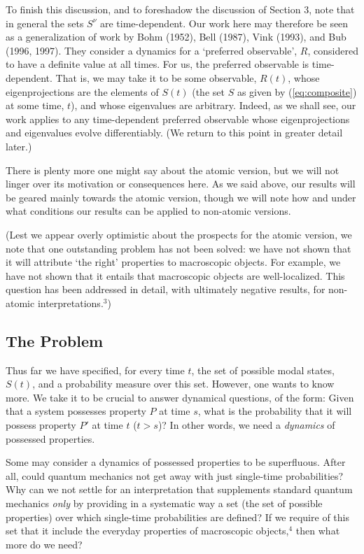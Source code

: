 \documentclass[12pt]{article}
\newcommand{\gn}{\nu}                                           %
\begin{document}
To finish this discussion, and to foreshadow the discussion of Section 
3, note that in general the sets $S^{\gn}$ are time-dependent.  Our 
work here may therefore be seen as a generalization of work by Bohm 
(1952), Bell (1987), Vink (1993), and Bub (1996, 1997).  They consider 
a dynamics for a `preferred observable', $R$, considered to have a 
definite value at all times.  For us, the preferred observable is 
time-dependent.  That is, we may take it to be some observable, 
$R(t)$, whose eigenprojections are the elements of $S(t)$ (the set $S$ 
as given by (\ref{eq:composite}) at some time, $t$), and whose 
eigenvalues are arbitrary.  Indeed, as we shall see, our work applies 
to any time-dependent preferred observable whose eigenprojections and 
eigenvalues evolve differentiably.  (We return to this point in 
greater detail later.)

There is plenty more one might say about the atomic version, but we
will not linger over its motivation or consequences here.  As we said
above, our results will be geared mainly towards the atomic version,
though we will note how and under what conditions our results can be
applied to non-atomic versions.

(Lest we appear overly optimistic about the prospects for the atomic
version, we note that one outstanding problem has not been solved: we have
not shown that it will attribute `the right' properties to macroscopic
objects. For example, we have not shown that it entails that macroscopic
objects are well-localized. This question has been addressed in detail,
with ultimately negative results, for non-atomic interpretations.$^{3}$)


\subsection{The Problem}


Thus far we have specified, for every time $t$, the set of possible 
modal states, $S(t)$, and a probability measure over this set.  
However, one wants to know more.  We take it to be crucial to answer 
dynamical questions, of the form: Given that a system possesses 
property $P$ at time $s$, what is the probability that it will possess 
property $P'$ at time $t$ ($t > s$)?  In other words, we need a {\it 
dynamics} of possessed properties.

Some may consider a dynamics of possessed properties to be
superfluous.  After all, could quantum mechanics not get away with
just single-time probabilities?  Why can we not settle for an
interpretation that supplements standard quantum mechanics {\it only}
by providing in a systematic way a set (the set of possible
properties) over which single-time probabilities are defined?  If
we require of this set that it include the everyday properties of
macroscopic objects,$^4$ then what more do we need?
\end{document}
